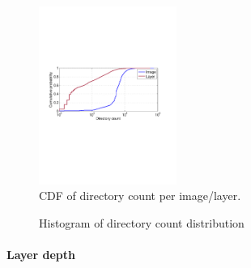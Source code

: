 \begin{figure}
	\centering
	\includegraphics[width=0.4\textwidth]{graphs/dir-cnt-cdf.pdf}
	\caption{CDF of directory count per image/layer.
	}
	\label{fig:reference-cnt}
\end{figure}

\begin{figure}[!t]
	\centering
	\caption{Histogram of directory count distribution}
	\label{fig:reference-cnt}
\end{figure}

\paragraph{Layer depth}


